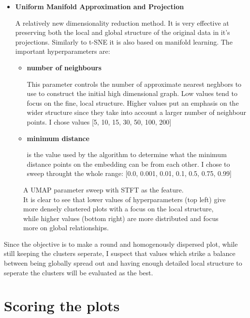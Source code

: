 \documentclass[a4paper, 12pt, twoside]{report}
\begin{document}
\begin{itemize}
\item \textbf{Uniform Manifold Approximation and Projection}

A relatively new dimensionality reduction method. It is very effective at preserving both the local and global structure of the original data in it's projections. Similarly to t-SNE it is also based on manifold learning. The important hyperparameters are:
\begin{itemize}
\item \textbf{ number of neighbours }

This parameter controls the number of approximate nearest neghbors to use to construct the initial high dimensional graph. Low values tend to focus on the fine, local structure. Higher values put an emphasis on the wider structure since they take into account a larger number of neighbour points. I chose values [5, 10, 15, 30, 50, 100, 200]

  \item \textbf{ minimum distance }

is the value used by the algorithm to determine what the minimum distance points on the embedding can be from each other. I chose to sweep throught the whole range: [0.0, 0.001, 0.01, 0.1, 0.5, 0.75, 0.99]
\end{itemize}
\end{itemize}

\begin{figure}[h!tbp]
\centering
{}
\caption{A UMAP parameter sweep with STFT as the feature.\\ It is clear to see that lower values of hyperparameters (top left) give more densely clustered plots with a focus on the local structure, while higher values (bottom right) are more distributed and focus more on global relationships.}
\end{figure}

Since the objective is to make a round and homogenously dispersed plot, while still keeping the clusters seperate, I suspect that values which strike a balance between being globally spread out and having enough detailed local structure to seperate the clusters will be evaluated as the best.

\section{Scoring the plots}
\label{sec:org007743d}
\end{document}
